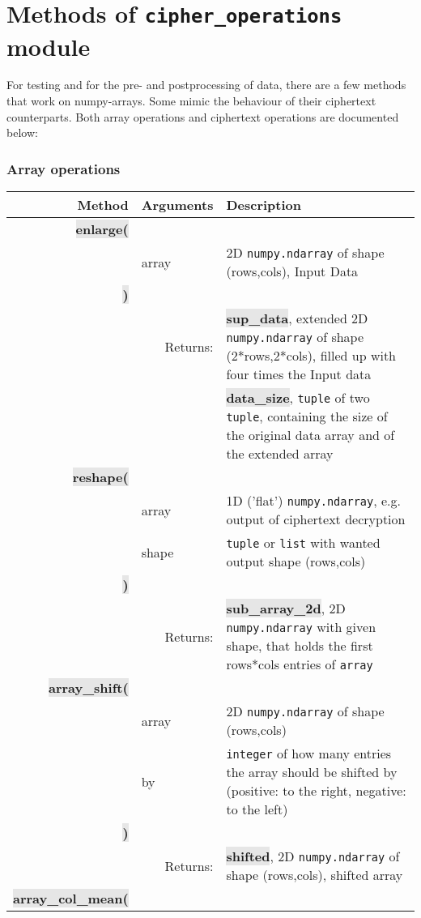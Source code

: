 \documentclass[a4paper]{article}
\newcommand{\python}[1]{\texttt{#1}}
\newcommand{\pymethod}[1]{{\ttfamily\colorbox[HTML]{e6e6e6}{\color[HTML]{0066ba}\textbf{\small #1}}}}
\newcommand{\pyreturn}[1]{{\ttfamily\colorbox[HTML]{e6e6e6}{\color[HTML]{ba0066}\textbf{\small #1}}}}
\begin{document}
\section*{Methods of \texttt{cipher\_operations} module}
For testing and for the pre- and postprocessing of data, there are a few methods that work on numpy-arrays. Some mimic the behaviour of their ciphertext counterparts. Both array operations and ciphertext operations are documented below:
\subsubsection*{Array operations}
\sffamily
\begin{tabular}{r|p{3cm}|p{8cm}}
Method&Arguments&Description\\
\hline
\pymethod{enlarge(}&&\\
&array&2D \python{numpy.ndarray} of shape (rows,cols), Input Data\\
\pymethod{)}&&\\
&\multicolumn{1}{r|}{Returns:}&\pyreturn{sup\_data}, extended 2D \python{numpy.ndarray} of shape (2*rows,2*cols), filled up with four times the Input data\\
&&\pyreturn{data\_size}, \python{tuple} of two \python{tuple}, containing the size of the original data array and of the extended array\\
\hline\pymethod{reshape(}&&\\
&array&1D ('flat') \python{numpy.ndarray}, e.g. output of ciphertext decryption\\
&shape&\python{tuple} or \python{list} with wanted output shape (rows,cols)\\
\pymethod{)}&&\\
&\multicolumn{1}{r|}{Returns:}&\pyreturn{sub\_array\_2d}, 2D \python{numpy.ndarray} with given shape, that holds the first rows*cols entries of \python{array}\\
\hline\pymethod{array\_shift(}&&\\
&array&2D \python{numpy.ndarray} of shape (rows,cols)\\
&by&\python{integer} of how many entries the array should be shifted by (positive: to the right, negative: to the left)\\
\pymethod{)}&&\\
&\multicolumn{1}{r|}{Returns:}&\pyreturn{shifted}, 2D \python{numpy.ndarray} of shape (rows,cols), shifted array\\
\hline\pymethod{array\_col\_mean(}&&\\

\end{tabular}
\end{document}
